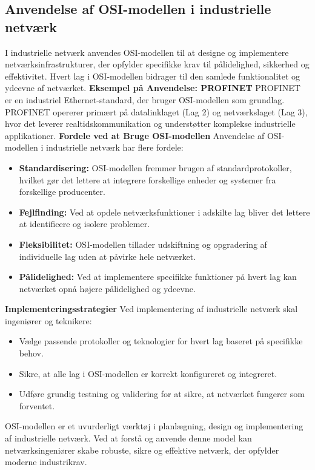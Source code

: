 \subsection{Anvendelse af OSI-modellen i industrielle netværk}
I industrielle netværk anvendes OSI-modellen til at designe og implementere netværksinfrastrukturer, der opfylder specifikke krav til pålidelighed, sikkerhed og effektivitet. Hvert lag i OSI-modellen bidrager til den samlede funktionalitet og ydeevne af netværket.
\newline
\newline
\noindent\textbf{Eksempel på Anvendelse: PROFINET}
PROFINET er en industriel Ethernet-standard, der bruger OSI-modellen som grundlag. PROFINET opererer primært på datalinklaget (Lag 2) og netværkslaget (Lag 3), hvor det leverer realtidskommunikation og understøtter komplekse industrielle applikationer.
\newline
\newline
\noindent\textbf{Fordele ved at Bruge OSI-modellen}
Anvendelse af OSI-modellen i industrielle netværk har flere fordele:
\begin{itemize}
	\item \textbf{Standardisering:} OSI-modellen fremmer brugen af standardprotokoller, hvilket gør det lettere at integrere forskellige enheder og systemer fra forskellige producenter.
	\item \textbf{Fejlfinding:} Ved at opdele netværksfunktioner i adskilte lag bliver det lettere at identificere og isolere problemer.
	\item \textbf{Fleksibilitet:} OSI-modellen tillader udskiftning og opgradering af individuelle lag uden at påvirke hele netværket.
	\item \textbf{Pålidelighed:} Ved at implementere specifikke funktioner på hvert lag kan netværket opnå højere pålidelighed og ydeevne.
\end{itemize}
\textbf{Implementeringsstrategier}
Ved implementering af industrielle netværk skal ingeniører og teknikere:
\begin{itemize}
	\item Vælge passende protokoller og teknologier for hvert lag baseret på specifikke behov.
	\item Sikre, at alle lag i OSI-modellen er korrekt konfigureret og integreret.
	\item Udføre grundig testning og validering for at sikre, at netværket fungerer som forventet.
\end{itemize}
\noindent OSI-modellen er et uvurderligt værktøj i planlægning, design og implementering af industrielle netværk. Ved at forstå og anvende denne model kan netværksingeniører skabe robuste, sikre og effektive netværk, der opfylder moderne industrikrav.

